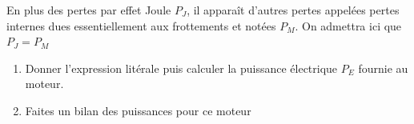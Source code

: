 \documentclass[a4paper,12pt]{article}
\begin{document}
En plus des pertes par effet Joule $P_J$, il apparaît d’autres pertes appelées pertes internes dues essentiellement aux frottements et notées $P_M$.
On admettra ici que $P_J = P_M$

\begin{enumerate}
  \item{} Donner l'expression litérale puis calculer la puissance électrique $P_E$ fournie au moteur.
  \item{} Faites un bilan des puissances pour ce moteur
\end{enumerate}
%
%
%
%
%
%
%
%
%
%
%
%
\end{document}
